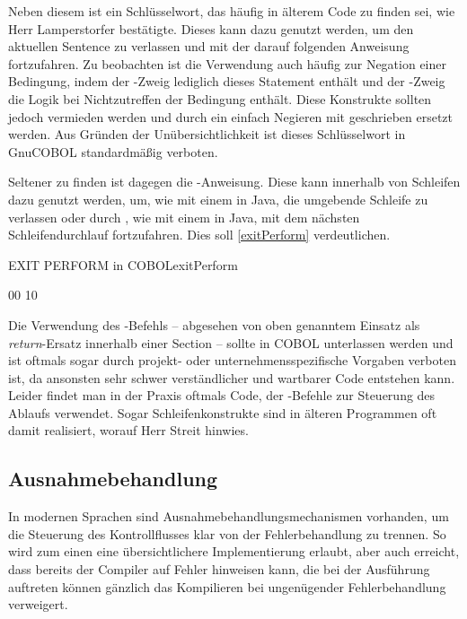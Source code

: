 Neben diesem ist  ein Schlüsselwort, das häufig in älterem Code zu finden sei, wie Herr Lamperstorfer bestätigte. Dieses kann dazu genutzt werden, um den aktuellen Sentence zu verlassen und mit der darauf folgenden Anweisung fortzufahren. Zu beobachten ist die Verwendung auch häufig zur Negation einer Bedingung, indem der -Zweig lediglich dieses Statement enthält und der -Zweig die Logik bei Nichtzutreffen der Bedingung enthält. Diese Konstrukte sollten jedoch vermieden werden und durch ein einfach Negieren mit  geschrieben \bzw ersetzt werden. Aus Gründen der Unübersichtlichkeit ist dieses Schlüsselwort in GnuCOBOL standardmäßig verboten. 

Seltener zu finden ist dagegen die -Anweisung. Diese kann innerhalb von Schleifen dazu genutzt werden, um, wie mit einem  in Java, die umgebende Schleife zu verlassen oder durch , wie mit einem  in Java, mit dem nächsten Schleifendurchlauf fortzufahren. Dies soll \autoref{exitPerform} verdeutlichen.

\begin{codeWithCaption}{EXIT PERFORM in COBOL}{exitPerform}
\begin{shellwindow}
00
10
\end{shellwindow}
\end{codeWithCaption}

Die Verwendung des -Befehls -- abgesehen von oben genanntem Einsatz als \textit{return}-Ersatz innerhalb einer Section -- sollte in COBOL unterlassen werden und ist oftmals sogar durch projekt- oder unternehmensspezifische Vorgaben verboten ist, da ansonsten sehr schwer verständlicher und wartbarer Code entstehen kann. Leider findet man in der Praxis oftmals Code, der -Befehle zur Steuerung des Ablaufs verwendet. Sogar Schleifenkonstrukte sind in älteren Programmen oft damit realisiert, worauf Herr Streit hinwies.

\subsection{Ausnahmebehandlung}

In modernen Sprachen sind Ausnahmebehandlungsmechanismen vorhanden, um die Steuerung des Kontrollflusses klar von der Fehlerbehandlung zu trennen. So wird zum einen eine übersichtlichere Implementierung erlaubt, aber auch erreicht, dass bereits der Compiler auf Fehler hinweisen kann, die bei der Ausführung auftreten können \bzw gänzlich das Kompilieren bei ungenügender Fehlerbehandlung verweigert.

